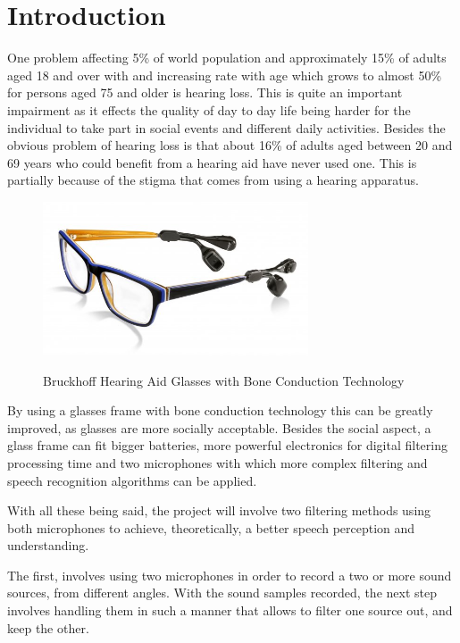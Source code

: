 \chapter{Introduction}\label{ch:introduction}
One problem affecting 5\% of world population and approximately 15\% of adults aged 18 and over with and 
increasing rate with age which grows to almost 50\% for persons aged 75 and older is hearing loss.
This is quite an important impairment as it effects the quality of day to day life being harder for the 
individual to take part in social events and different daily activities. Besides the obvious problem of 
hearing loss is that about 16\% of adults aged between 20 and 69 years who could benefit from a hearing aid 
have never used one. This is partially because of the stigma that comes from using a hearing apparatus.
\cite{WHO}
 
 \begin{figure}[htp]
	\centering
	\includegraphics[width = 0.7\textwidth]{Illustrations/glasses_with_hearing_stuff.jpg}
	\caption{Bruckhoff Hearing Aid Glasses with Bone Conduction Technology}\cite{GLASSES}
	\label{fig:BoneConductionGlasses}
\end{figure}
 
By using a glasses frame with bone conduction technology this can be greatly improved, as glasses are more 
socially acceptable. Besides the social aspect, a glass frame can fit bigger batteries, more powerful 
electronics for digital filtering processing time and two microphones with which more complex filtering and 
speech recognition algorithms can be applied.

With all these being said, the project will involve two filtering methods using both microphones to achieve, 
theoretically, a better speech perception and understanding.

The first, involves using two microphones in order to record a two or 
more sound sources, from different angles.
With the sound samples recorded, the next step involves handling them 
in such a manner that allows to filter one source out, and keep the other.

